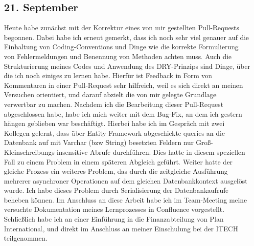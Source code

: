 \subsection{21. September}
Heute habe zunächst mit der Korrektur eines von mir gestellten Pull-Requests begonnen. Dabei habe ich erneut gemerkt, dass ich noch sehr viel genauer auf die Einhaltung von Coding-Conventions und Dinge wie die korrekte Formulierung von Fehlermeldungen und Benennung von Methoden achten muss. Auch die Strukturierung meines Codes und Anwendung des DRY-Prinzips sind Dinge, über die ich noch einiges zu lernen habe. Hierfür ist Feedback in Form von Kommentaren in einer Pull-Request sehr hilfreich, weil es sich direkt an meinen Versuchen orientiert, und darauf abzielt die von mir gelegte Grundlage verwertbar zu machen. Nachdem ich die Bearbeitung dieser Pull-Request abgeschlossen habe, habe ich mich weiter mit dem Bug-Fix, an dem ich gestern hängen geblieben war beschäftigt. Hierbei habe ich im Gespräch mit zwei Kollegen gelernt, dass über Entity Framework abgeschickte queries an die Datenbank auf mit Varchar (bzw String) besetzten Feldern nur Groß-Kleinschreibungs insensitive Abrufe durchführen. Dies hatte in diesem speziellen Fall zu einem Problem in einem späteren Abgleich geführt. Weiter hatte der gleiche Prozess ein weiteres Problem, das durch die zeitgleiche Ausführung mehrerer asynchroner Operationen auf dem gleichen Datenbankkontext ausgelöst wurde. Ich habe dieses Problem durch Serialisierung der Datenbankaufrufe beheben können. Im Anschluss an diese Arbeit habe ich im Team-Meeting meine versuchte Dokumentation meines Lernprozesses in Confluence vorgestellt. Schließlich habe ich an einer Einführung in die Finanzabteilung von Plan International, und direkt im Anschluss an meiner Einschulung bei der ITECH teilgenommen.